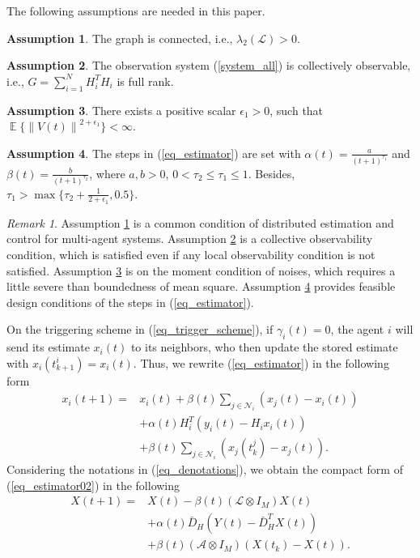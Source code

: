 \documentclass[10pt,journal,final]{IEEEtran}
\DeclareMathOperator{\Expect}{\mathbb{E}}
\newcommand{\norm}[1]{\left\lVert#1\right\rVert}
\theoremstyle{plain}
\theoremstyle{definition}
\newtheorem{assumption}{\textbf{Assumption}}[section]
\theoremstyle{remark}
\newtheorem{remark}{Remark}[section]
\begin{document}
The following assumptions are needed  in this paper.
\begin{assumption}\label{ass_graph}
The  graph is connected, i.e., $\lambda_2(\mathcal{L})>0$.
\end{assumption}
\begin{assumption}\label{ass_obser}
	The observation system (\ref{system_all}) is collectively observable, i.e., 
	$G=\sum_{i=1}^{N}H_i^TH_i$ is full rank. 
\end{assumption}
\begin{assumption}\label{ass_noise}
	There exists a positive scalar $\epsilon_1>0$, such that $\Expect \{\norm{V(t)}^{2+\epsilon_1}\}<\infty.$
\end{assumption}
\begin{assumption}\label{ass_steps}
	The steps in (\ref{eq_estimator}) are set with  $\alpha(t)=\frac{a}{(t+1)^{\tau_1}}$ and $\beta(t)=\frac{b}{(t+1)^{\tau_2}}$, where $a,b>0$, $0<\tau_2\leq\tau_1\leq 1$. Besides, $\tau_1>\max\{\tau_2+\frac{1}{2+\epsilon_1},0.5\}$.
\end{assumption}
\begin{remark}
Assumption \ref{ass_graph} is a common condition of distributed estimation and control for multi-agent systems. Assumption \ref{ass_obser} is a collective observability condition, which is satisfied even if any local observability condition is not satisfied. Assumption \ref{ass_noise} is on the moment condition of noises, which requires a little severe than boundedness of mean square. Assumption \ref{ass_steps} provides feasible design conditions of the steps in (\ref{eq_estimator}). 
\end{remark}

On the triggering scheme in (\ref{eq_trigger_scheme}), if $\gamma_i(t)=0$, the agent $i$ will send its estimate $x_{i}(t)$ to its neighbors, who then update the stored estimate with $x_{i}(t_{k+1}^i)=x_{i}(t)$. Thus,   we rewrite (\ref{eq_estimator}) in the following form
\begin{align}\label{eq_estimator02}
x_{i}(t+1)=&x_{i}(t)+\beta(t)\sum_{j\in\mathcal{N}_{i}}(x_{j}(t)-x_{i}(t))\nonumber\\
&+\alpha(t)H_{i}^T( y_{i}(t)-H_{i}x_{i}(t))\\
&+\beta(t)\sum_{j\in\mathcal{N}_{i}}(x_{j}(t_{k}^j)-x_{j}(t))\nonumber.
\end{align} 
Considering  the notations in (\ref{eq_denotations}), 
we  obtain the compact form of (\ref{eq_estimator02}) in the following
\begin{align}\label{eq_estimator03}
X(t+1)=&X(t)-\beta(t)(\mathcal{L}\otimes I_M)X(t)\nonumber\\
&+\alpha(t)\bar D_H(Y(t)-\bar D_H^TX(t))\\
&+\beta(t)(\mathcal{A}\otimes I_M)(X(t_{k})-X(t))\nonumber.
\end{align}
\end{document}
